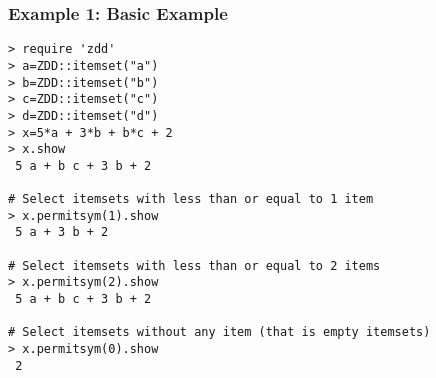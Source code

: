 \subsubsection*{Example 1: Basic Example}



\begin{Verbatim}[baselinestretch=0.7,frame=single]
> require 'zdd'
> a=ZDD::itemset("a")
> b=ZDD::itemset("b")
> c=ZDD::itemset("c")
> d=ZDD::itemset("d")
> x=5*a + 3*b + b*c + 2
> x.show
 5 a + b c + 3 b + 2

# Select itemsets with less than or equal to 1 item 
> x.permitsym(1).show
 5 a + 3 b + 2

# Select itemsets with less than or equal to 2 items
> x.permitsym(2).show
 5 a + b c + 3 b + 2

# Select itemsets without any item (that is empty itemsets) 
> x.permitsym(0).show
 2
\end{Verbatim}

